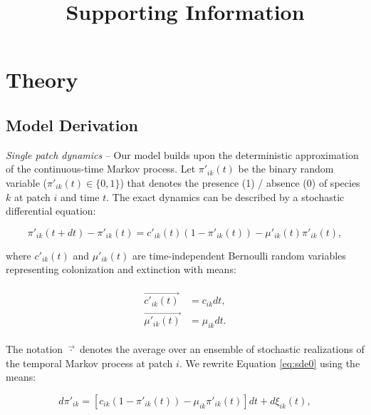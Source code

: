 \documentclass[11pt, class=article, crop=false]{standalone}
\title{Supporting Information}
\date{} %
\begin{document}
\renewcommand{\theequation}{S\arabic{equation}}
\renewcommand{\thetable}{S\arabic{table}}
\renewcommand{\thefigure}{S\arabic{figure}}

\maketitle

\tableofcontents

\newpage

\section{Theory}

\subsection{Model Derivation}

\textit{Single patch dynamics} --
Our model builds upon the deterministic approximation of the continuous-time Markov process.
Let $\pi'_{ik}(t)$ be the binary random variable ($\pi'_{ik}(t) \in \{0, 1\}$) that denotes the presence (1) / absence (0) of species $k$ at patch $i$ and time $t$.
The exact dynamics can be described by a stochastic differential equation:

\begin{equation}
    \pi'_{ik}(t + dt) - \pi'_{ik}(t) = c'_{ik}(t) (1 - \pi'_{ik}(t)) - \mu'_{ik}(t) \pi'_{ik}(t),
    \label{eq:sde0}
\end{equation}

where $c'_{ik}(t)$ and $\mu'_{ik}(t)$ are time-independent Bernoulli random variables representing colonization and extinction with means:

\begin{align}
    \begin{split}
        \overrightarrow{c'_{ik}(t)} &= c_{ik} dt,\\
        \overrightarrow{\mu'_{ik}(t)} &= \mu_{ik} dt.
    \end{split}
\end{align}

The notation $\overrightarrow{\cdot}$ denotes the average over an ensemble of stochastic realizations of the temporal Markov process at patch $i$.
We rewrite Equation \ref{eq:sde0} using the means:

\begin{equation}
    d \pi'_{ik} = [c_{ik} (1 - \pi'_{ik}(t)) - \mu_{ik} \pi'_{ik}(t)]dt + d\xi_{ik}(t),
    \label{eq:sde1}
\end{equation}
\end{document}
